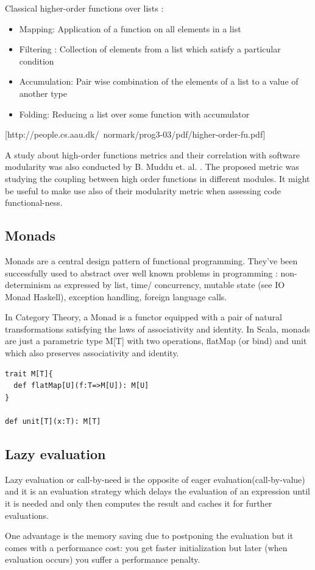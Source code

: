 \documentclass{article}
\begin{document}
Classical higher-order functions over lists :

\begin{itemize}
\item Mapping: Application of a function on all elements in a list
\item Filtering : Collection of elements from a list which satisfy a particular condition
\item Accumulation: Pair wise combination of the elements of a list to a value of
another type
\item Folding: Reducing a list over some function with accumulator
\end{itemize}
[http://people.cs.aau.dk/~normark/prog3-03/pdf/higher-order-fu.pdf]

A study about high-order functions metrics and their correlation with software modularity was also conducted by B. Muddu et. al. \cite{DBLP:conf/icse/MudduABP13}. The proposed metric was studying the coupling between high order functions in different modules. It might be useful to make use also of their modularity metric when assessing code functional-ness.\par 

\subsection {Monads}  \label{monads}
Monads are a central design pattern of functional programming. They've been successfully used to abstract over well known problems in programming \cite{Jones01tacklingthe}: non-determinism as expressed by list, time/ concurrency, mutable state (see IO Monad Haskell), exception handling, foreign language calls.

In Category Theory, a Monad is a functor equipped with a pair of natural transformations satisfying the laws of associativity and identity. In Scala, monads are just a parametric type M[T] with two operations, flatMap (or bind) and unit which also preserves associativity and identity. \par

\begin{lstlisting}
trait M[T]{
  def flatMap[U](f:T=>M[U]): M[U]
}

def unit[T](x:T): M[T]
\end{lstlisting}

\subsection {Lazy evaluation}
Lazy evaluation or call-by-need is the opposite of eager evaluation(call-by-value) and it is an evaluation strategy which delays the evaluation of an expression until it is needed and only then computes the result and caches it for further evaluations. \par
One advantage is the memory saving due to postponing the evaluation but it comes with a performance cost: you get faster initialization but later (when evaluation occurs) you suffer a performance penalty.\par
\end{document}
